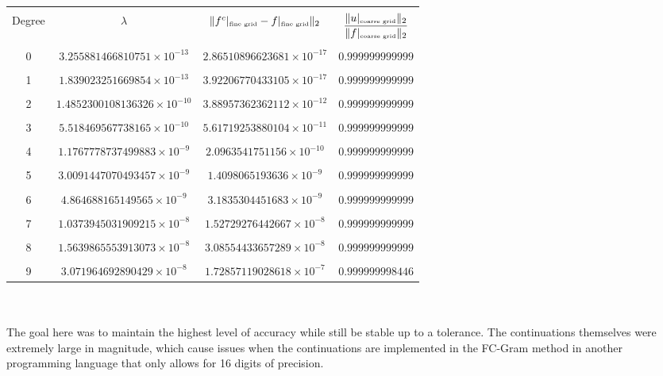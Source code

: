 \documentclass[11pt]{amsart}
\begin{document}
\begin{tabular}{|c|c|c|c|}
\hline & & &\\
Degree & $\lambda$ & $\| f^c|_{\text{\tiny{fine grid}}}-f|_{\text{\tiny{fine grid}}}\|_2$ & $\dfrac{\|u|_{\text{\tiny{coarse grid}}}\|_2}{\|f|_{\text{\tiny{coarse grid}}}\|_2}$ \\ \hline  & & & \\
0 & $3.255881466810751\times 10^{-13}$ & $2.86510896623681\times 10^{-17}$ & $0.999999999999$ \\ \hline  & & &\\ 
1 & $1.839023251669854\times 10^{-13}$ & $3.92206770433105\times 10^{-17}$ & $0.999999999999$ \\ \hline  & & &\\
2 & $1.4852300108136326\times 10^{-10}$ &  $3.88957362362112\times 10^{-12}$ & $0.999999999999$ \\ \hline & & & \\
3 & $5.518469567738165\times 10^{-10}$ & $5.61719253880104\times 10^{-11}$ & $0.999999999999$ \\ \hline & & & \\
4 & $1.1767778737499883\times 10^{-9}$ & $2.0963541751156\times 10^{-10}$ & $0.999999999999$ \\ \hline & & & \\
5 & $3.0091447070493457\times 10^{-9}$ & $1.4098065193636\times 10^{-9}$ & $0.999999999999$ \\ \hline & & & \\
6 & $4.864688165149565\times 10^{-9}$ & $3.1835304451683\times 10^{-9}$ & $0.999999999999$ \\ \hline & & & \\
7 & $1.0373945031909215\times 10^{-8}$ & $1.52729276442667\times 10^{-8}$ &  $0.999999999999$ \\ \hline & & & \\
8 & $1.5639865553913073\times 10^{-8}$ & $3.08554433657289\times 10^{-8}$ & $0.999999999999$  \\ \hline & & & \\
9 & $3.071964692890429\times 10^{-8}$ & $1.72857119028618\times 10^{-7}$& $0.999999998446$  \\ \hline

\end{tabular}   
\\
\\


The goal here was to maintain the highest level of accuracy while still be stable up to a tolerance.  The continuations themselves were extremely large in magnitude, which cause issues when the continuations are implemented in the FC-Gram method in another programming language that only allows for 16 digits of precision.
\end{document}
